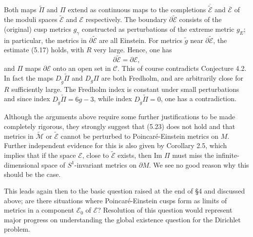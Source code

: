 \documentclass[11pt,amsfonts]{amsart}
\begin{document}
  Both maps $\widetilde \Pi$ and $\Pi$ extend as continuous maps to the completions 
$\overline{\widetilde{\mathcal E}}$ and $\overline{\mathcal E}$ of the moduli spaces 
$\widetilde{\mathcal E}$ and ${\mathcal E}$ respectively. The boundary 
$\partial \widetilde {\mathcal E}$ consists of the (original) cusp metrics $g_{\gamma}$ 
constructed as perturbations of the extreme metric $g_{E}$; in particular, 
the metrics in $\partial \widetilde {\mathcal E}$ are all Einstein. For metrics 
$\widetilde g$ near $\partial \widetilde {\mathcal E}$, the estimate (5.17) holds, 
with $R$ very large. Hence, one has 
$$\partial \widetilde {\mathcal E} = \partial {\mathcal E},$$ 
and $\Pi$ maps $\partial {\mathcal E}$ onto an open set in ${\mathcal C}$. 
This of course contradicts Conjecture 4.2. In fact the maps 
$D_{\widetilde g}\widetilde \Pi$ and $D_{g}\Pi$ are both Fredholm, and are 
arbitrarily close for $R$ sufficiently large. The Fredholm index is constant 
under small perturbations and since index $D_{\widetilde g}\widetilde \Pi = 
6g-3$, while index $D_{\widetilde g}\widetilde \Pi = 0$, one has a contradiction. 

\medskip

 Although the arguments above require some further justifications to be 
made completely rigorous, they strongly suggest that (5.23) does not 
hold and that metrics in $\widetilde{\mathcal M}$ or $\widetilde{\mathcal E}$ 
cannot be perturbed to Poincar\'e-Einstein metrics on $M$. Further independent 
evidence for this is also given by Corollary 2.5, which implies that if the 
space ${\mathcal E}$, close to $\widetilde{\mathcal E}$ exists, then Im $\Pi$ 
must miss the infinite-dimensional space of $S^{1}$-invariant metrics 
on $\partial M$. We see no good reason why this should be the case. 

\medskip

 This leads again then to the basic question raised at the end of \S 4 
and discussed above; are there situations where Poincar\'e-Einstein cusps 
form as limits of metrics in a component ${\mathcal E}_{0}$ of ${\mathcal E}$? 
Resolution of this question would represent major progress on understanding the 
global existence question for the Dirichlet problem. 
\end{document}
